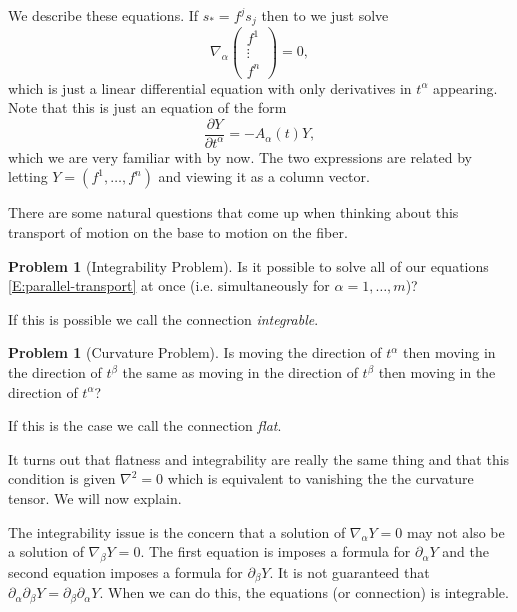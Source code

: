 \documentclass[12pt]{book}
\numberwithin{equation}{section}
\theoremstyle{definition}
\newtheorem{problem}[theorem]{Problem}
\theoremstyle{remark}
\begin{document}
We describe these equations.
If $s_* = f^js_j$ then to we just solve 
\begin{equation}\label{E:parallel-transport}
\nabla_{\alpha} \begin{pmatrix} f^1 \\
\vdots \\
f^n  \end{pmatrix} = 0,
\end{equation}
which is just a linear differential equation with only derivatives in $t^{\alpha}$ appearing. 
Note that this is just an equation of the form 
$$ \dfrac{\partial Y}{\partial t^{\alpha}} = -A_{\alpha}(t) Y, $$
which we are very familiar with by now.
The two expressions are related by letting $Y = (f^1,\ldots,f^n)$ and viewing it as a column vector.

There are some natural questions that come up when thinking about this transport of motion on the base to motion on the fiber.
\begin{problem}[Integrability Problem]
	Is it possible to solve all of our equations \eqref{E:parallel-transport} at once (i.e. simultaneously for $\alpha=1,\ldots,m$)? 
\end{problem}
If this is possible we call the connection \emph{integrable}.
\begin{problem}[Curvature Problem]
	Is moving the direction of $t^{\alpha}$ then moving in the direction of $t^{\beta}$ the same as moving in the direction of $t^{\beta}$ then moving in the direction of $t^{\alpha}$?
\end{problem}
If this is the case we call the connection \emph{flat}.

It turns out that flatness and integrability are really the same thing and that this condition is given $\nabla^2=0$ which is equivalent to vanishing the the curvature tensor.
We will now explain.

The integrability issue is the concern that a solution of $\nabla_{\alpha}Y=0$ may not also be a solution of $\nabla_{\beta}Y=0$.
The first equation is imposes a formula for $\partial_{\alpha} Y$ and the second equation imposes a formula for $\partial_{\beta}Y$. 
It is not guaranteed that $\partial_{\alpha} \partial_{\beta}Y = \partial_{\beta}\partial_{\alpha} Y$. 
When we can do this, the equations (or connection) is integrable. 
\end{document}

